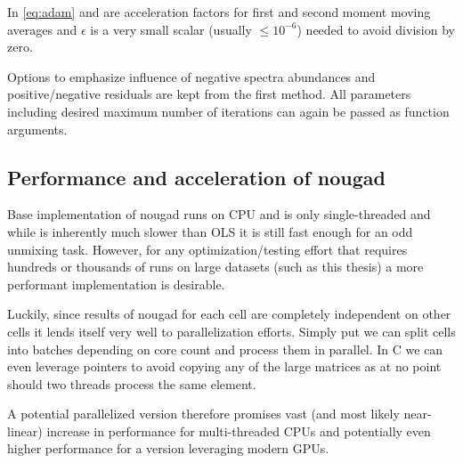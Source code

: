 In \cref{eq:adam}  and  are acceleration factors for first and second moment moving averages and $\epsilon$ is a very small scalar (usually $\leq 10^{-6}$) needed to avoid division by zero.

Options to emphasize influence of negative spectra abundances and positive/negative residuals are kept from the first method. All parameters including desired maximum number of iterations can again be passed as function arguments.
\subsection{Performance and acceleration of nougad}
Base implementation of nougad runs on CPU and is only single-threaded and while is inherently much slower than OLS it is still fast enough for an odd unmixing task. However, for any optimization/testing effort that requires hundreds or thousands of runs on large datasets (such as this thesis) a more performant implementation is desirable.

Luckily, since results of nougad for each cell are completely independent on other cells it lends itself very well to parallelization efforts. Simply put we can split cells into batches depending on core count and process them in parallel. In C we can even leverage pointers to avoid copying any of the large matrices as at no point should two threads process the same element.

A potential parallelized version therefore promises vast (and most likely near-linear) increase in performance for multi-threaded CPUs and potentially even higher performance for a version leveraging modern GPUs.  


